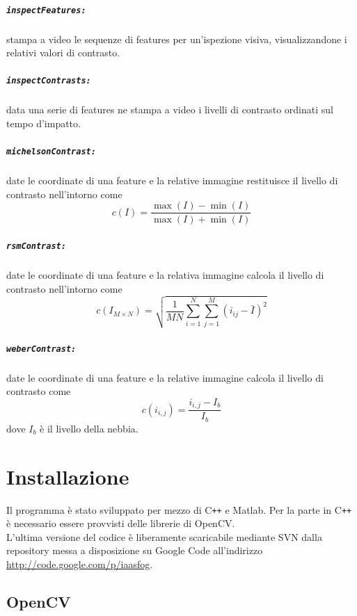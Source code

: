 \documentclass[12pt]{report}
\begin{document}
\paragraph*{\verb_inspectFeatures:_} stampa a video le sequenze di features per un'ispezione visiva, visualizzandone i relativi valori di contrasto.

\paragraph*{\verb_inspectContrasts:_} data una serie di features ne stampa a video i livelli di contrasto ordinati sul tempo d'impatto.

\paragraph*{\verb_michelsonContrast:_} date le coordinate di una feature e la relative immagine restituisce il livello di contrasto nell'intorno come $$c\left(I\right) = \frac{\max(I)-\min(I)}{\max(I)+\min(I)}$$

\paragraph*{\verb_rsmContrast:_} date le coordinate di una feature e la relativa immagine calcola il livello di contrasto nell'intorno come $$ c\left(I_{M\times N}\right) = \sqrt{\frac{1}{MN}\sum_{i=1}^N\sum_{j=1}^M(i_{ij}-\bar{I})^2} $$

\paragraph*{\verb_weberContrast:_} date le coordinate di una feature e la relative immagine calcola il livello di contrasto come $$c\left(i_{i,j}\right)= \frac{i_{i,j}-I_b}{I_b}$$ dove $I_b$ \`e il livello della nebbia.



\chapter{Installazione}
\noindent Il programma \`e stato sviluppato per mezzo di C\verb|++| e Matlab. Per la parte in C\verb|++| \`e necessario essere provvisti delle librerie di OpenCV.\\
L'ultima versione del codice \`e liberamente scaricabile mediante SVN dalla repository messa a disposizione su Google Code all'indirizzo \url{http://code.google.com/p/iaasfog}.
\section{OpenCV}
\end{document}
